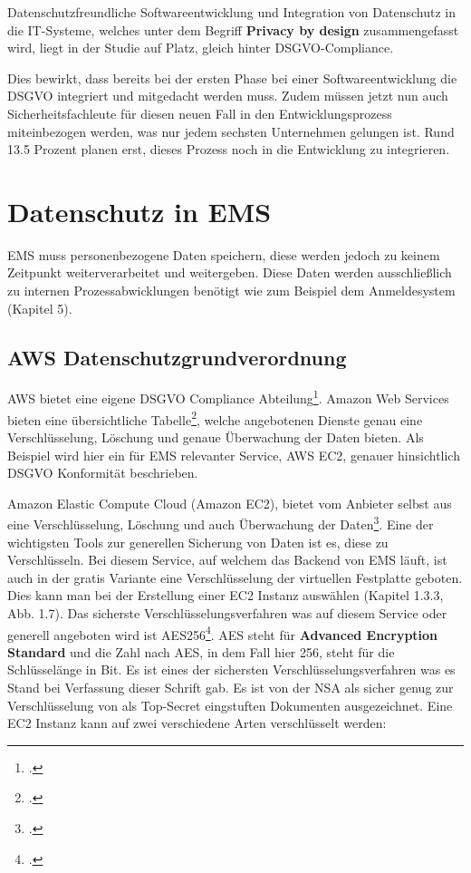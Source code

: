 Datenschutzfreundliche Softwareentwicklung und Integration von Datenschutz in die IT-Systeme, welches unter dem Begriff \textbf{Privacy by design} zusammengefasst wird, liegt in der Studie auf Platz, gleich hinter DSGVO-Compliance. 

Dies bewirkt, dass bereits bei der ersten Phase bei einer Softwareentwicklung die DSGVO integriert und mitgedacht werden muss. Zudem müssen jetzt nun auch Sicherheitsfachleute für diesen neuen Fall in den Entwicklungsprozess miteinbezogen werden, was nur jedem sechsten Unternehmen gelungen ist. Rund 13.5 Prozent planen erst, dieses Prozess noch in die Entwicklung zu integrieren.

\section{Datenschutz in EMS}
EMS muss personenbezogene Daten speichern, diese werden jedoch zu keinem Zeitpunkt weiterverarbeitet und weitergeben. Diese Daten werden ausschließlich zu internen Prozessabwicklungen benötigt wie zum Beispiel dem
Anmeldesystem (Kapitel 5). 

\subsection{AWS Datenschutzgrundverordnung}
AWS bietet eine eigene DSGVO Compliance Abteilung\footcite{aws-dsgvo}. Amazon Web Services bieten eine übersichtliche Tabelle\footcite{AWS-DSGVO-Tabelle}, welche angebotenen Dienste genau eine Verschlüsselung, Löschung und 
genaue Überwachung der Daten bieten. Als Beispiel wird hier ein für EMS relevanter Service, AWS EC2, genauer hinsichtlich DSGVO Konformität beschrieben.

Amazon Elastic Compute Cloud (Amazon EC2), bietet vom Anbieter selbst aus eine Verschlüsselung, Löschung und auch Überwachung der Daten\footcite{aws-ec2-dsgvo-alles}. Eine der wichtigsten Tools zur generellen Sicherung von Daten ist es, diese zu
Verschlüsseln. Bei diesem Service, auf welchem das Backend von EMS läuft, ist auch in der gratis Variante eine Verschlüsselung der virtuellen Festplatte geboten. Dies kann man bei der Erstellung einer EC2 Instanz auswählen
(Kapitel 1.3.3, Abb. 1.7). Das sicherste Verschlüsselungsverfahren was auf diesem Service oder generell angeboten wird ist AES256\footcite{aes256}. AES steht für \textbf{Advanced Encryption Standard} und die Zahl nach AES, in dem
Fall hier 256, steht für die Schlüsselänge in Bit. Es ist eines der sichersten Verschlüsselungsverfahren was es Stand bei Verfassung dieser Schrift gab. Es ist von der NSA als sicher genug zur Verschlüsselung von als Top-Secret
eingstuften Dokumenten ausgezeichnet.
Eine EC2 Instanz kann auf zwei verschiedene Arten verschlüsselt werden:

